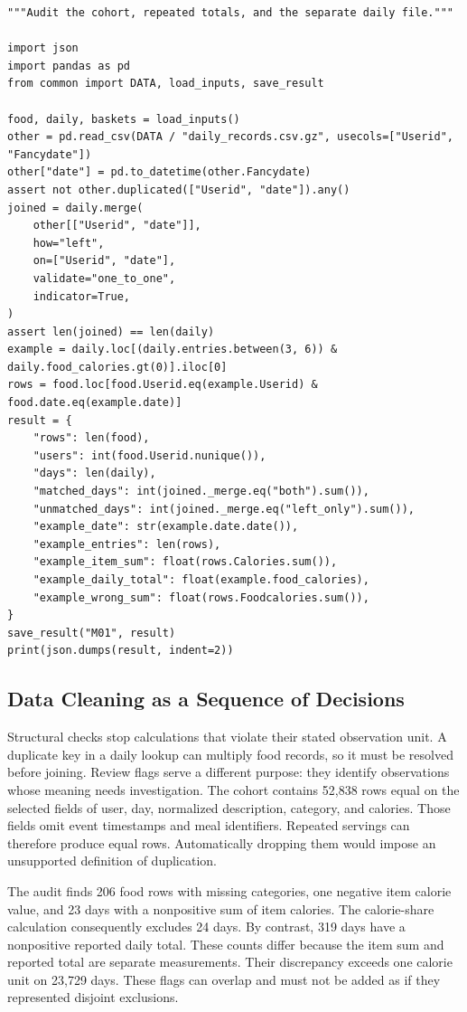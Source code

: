 \begin{Verbatim}[breaklines,breakanywhere,fontsize=\small]
"""Audit the cohort, repeated totals, and the separate daily file."""

import json
import pandas as pd
from common import DATA, load_inputs, save_result

food, daily, baskets = load_inputs()
other = pd.read_csv(DATA / "daily_records.csv.gz", usecols=["Userid", "Fancydate"])
other["date"] = pd.to_datetime(other.Fancydate)
assert not other.duplicated(["Userid", "date"]).any()
joined = daily.merge(
    other[["Userid", "date"]],
    how="left",
    on=["Userid", "date"],
    validate="one_to_one",
    indicator=True,
)
assert len(joined) == len(daily)
example = daily.loc[(daily.entries.between(3, 6)) & daily.food_calories.gt(0)].iloc[0]
rows = food.loc[food.Userid.eq(example.Userid) & food.date.eq(example.date)]
result = {
    "rows": len(food),
    "users": int(food.Userid.nunique()),
    "days": len(daily),
    "matched_days": int(joined._merge.eq("both").sum()),
    "unmatched_days": int(joined._merge.eq("left_only").sum()),
    "example_date": str(example.date.date()),
    "example_entries": len(rows),
    "example_item_sum": float(rows.Calories.sum()),
    "example_daily_total": float(example.food_calories),
    "example_wrong_sum": float(rows.Foodcalories.sum()),
}
save_result("M01", result)
print(json.dumps(result, indent=2))
\end{Verbatim}

\hypertarget{M01-data-cleaning-as-a-sequence-of-decisions}{%
\subsection{Data Cleaning as a Sequence of
Decisions}\label{M01-data-cleaning-as-a-sequence-of-decisions}}

\noindent Structural checks stop calculations that violate their stated
observation unit. A duplicate key in a daily lookup can multiply food
records, so it must be resolved before joining. Review flags serve a
different purpose: they identify observations whose meaning needs
investigation. The cohort contains 52,838 rows equal on the selected
fields of user, day, normalized description, category, and calories.
Those fields omit event timestamps and meal identifiers. Repeated
servings can therefore produce equal rows. Automatically dropping them
would impose an unsupported definition of duplication.

The audit finds 206 food rows with missing categories, one negative item
calorie value, and 23 days with a nonpositive sum of item calories. The
calorie-share calculation consequently excludes 24 days. By contrast,
319 days have a nonpositive reported daily total. These counts differ
because the item sum and reported total are separate measurements. Their
discrepancy exceeds one calorie unit on 23,729 days. These flags can
overlap and must not be added as if they represented disjoint
exclusions.


